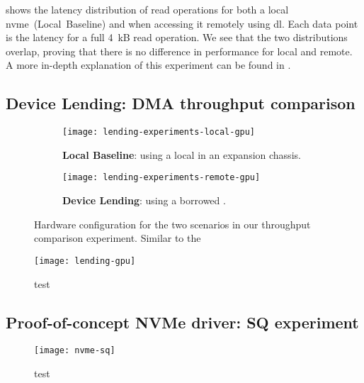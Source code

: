  shows the latency distribution of read operations for both a local \gls{nvme}~(Local~Baseline) and when accessing it remotely using \gls{dl}.
%
Each data point is the latency for a full 4~kB read operation.
%
We see that the two distributions overlap, proving that there is no difference in performance for local and remote.
%
A more in-depth explanation of this experiment can be found in .



\subsection{Device Lending: DMA throughput comparison}\label{sec:eval-bw}
\begin{figure}
    \centering
    \begin{subfigure}{\linewidth}
        \centering
        \texttt{[image: lending-experiments-local-gpu]}
        \caption{\textbf{Local Baseline}: using a local  in an expansion chassis.}
        \label{fig:eval-lending-gpu-local}
    \end{subfigure}
    \par\vspace{10mm}
    \begin{subfigure}{\linewidth}
        \centering
        \texttt{[image: lending-experiments-remote-gpu]}
        \caption{\textbf{Device Lending}: using a borrowed .}
        \label{fig:eval-lending-gpu-remote}
    \end{subfigure}
    \par\vspace{5mm}
    \caption
    {Hardware configuration for the two scenarios in our  throughput comparison experiment. Similar to the}
    \label{fig:eval-lending-gpu-topo}
\end{figure}


\begin{figure}
    \centering
    \texttt{[image: lending-gpu]}
    \caption{test}
\end{figure}


\subsection{Proof-of-concept NVMe driver: SQ experiment}
\begin{figure}
    \centering
    \texttt{[image: nvme-sq]}
    \caption{test}
\end{figure}




